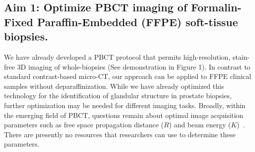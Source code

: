 \documentclass{NIHGrant}
\theoremstyle{theorem}
\begin{document}
\subsection*{Aim 1: Optimize PBCT imaging of Formalin-Fixed Paraffin-Embedded (FFPE) soft-tissue biopsies.}
We have already developed a PBCT protocol that permits high-resolution,
stain-free 3D imaging of whole-biopsies (See demonstration in Figure 1). In
contrast to standard contrast-based micro-CT, our approach can be applied to FFPE
clinical samples without deparaffinization. While we have already optimized this technology for the identification of glandular structure in prostate biopsies, further optimization may be needed for
different imaging tasks. Broadly, within the emerging field of PBCT, questions
remain about optimal image acquisition parameters such as free space propagation
distance (\(R\)) and beam energy
(\(K\))~\cite{pinkert-leetsch_three-dimensional_2023,norvik_synchrotron-based_2020}.
There are presently no resources that researchers can use to determine these
parameters.
\end{document}
